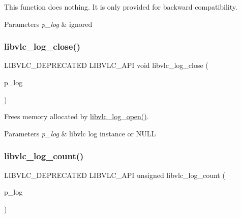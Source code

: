 This function does nothing. It is only provided for backward compatibility.


\begin{DoxyParams}{Parameters}
{\em p\+\_\+log} & ignored \\
\hline
\end{DoxyParams}
\mbox{\label{group__libvlc__log_gad67020aad8d82e715d205bff8b17f6c1}} 
\subsubsection{\texorpdfstring{libvlc\+\_\+log\+\_\+close()}{libvlc\_log\_close()}}
{\footnotesize\ttfamily L\+I\+B\+V\+L\+C\+\_\+\+D\+E\+P\+R\+E\+C\+A\+T\+ED L\+I\+B\+V\+L\+C\+\_\+\+A\+PI void libvlc\+\_\+log\+\_\+close (\begin{DoxyParamCaption}\item[{\hyperlink{structvlc__log__t}{libvlc\+\_\+log\+\_\+t} $\ast$}]{p\+\_\+log }\end{DoxyParamCaption})}

Frees memory allocated by \hyperlink{group__libvlc__log_ga95dd678e1ec9d77855e83b4f45b6d04d}{libvlc\+\_\+log\+\_\+open()}.


\begin{DoxyParams}{Parameters}
{\em p\+\_\+log} & libvlc log instance or N\+U\+LL \\
\hline
\end{DoxyParams}
\mbox{\label{group__libvlc__log_gafb00ae60f638b8bbe57029b67eaea8ec}} 
\subsubsection{\texorpdfstring{libvlc\+\_\+log\+\_\+count()}{libvlc\_log\_count()}}
{\footnotesize\ttfamily L\+I\+B\+V\+L\+C\+\_\+\+D\+E\+P\+R\+E\+C\+A\+T\+ED L\+I\+B\+V\+L\+C\+\_\+\+A\+PI unsigned libvlc\+\_\+log\+\_\+count (\begin{DoxyParamCaption}\item[{const \hyperlink{structvlc__log__t}{libvlc\+\_\+log\+\_\+t} $\ast$}]{p\+\_\+log }\end{DoxyParamCaption})}


